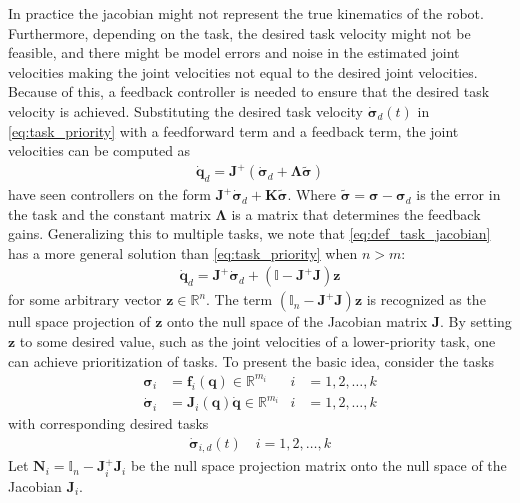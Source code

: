 In practice the jacobian might not represent the true kinematics of the robot.
Furthermore, depending on the task, the desired task velocity might not be feasible,
and there might be model errors and noise in the estimated joint velocities making
the joint velocities not equal to the desired joint velocities. Because of this,
a feedback controller is needed to ensure that the desired task velocity is
achieved. Substituting the desired task velocity $\dot{\bm{\sigma}}_d(t)$ in 
\autoref{eq:task_priority} with
a feedforward term and a feedback term, the joint velocities can be computed as
\begin{align}
    \dot{\bm{q}}_d = \bm{J}^{+} \left(\dot{\bm{\sigma}}_d + \bm{\Lambda}\tilde{\bm{\sigma}}\right)
\end{align}
{
    \color{red} have seen controllers on the form $\bm{J}^{+} \dot{\bm{\sigma}}_d + \bm{K}\tilde{\bm{\sigma}}$.
}
Where $\tilde{\bm{\sigma}} = \bm{\sigma} - \bm{\sigma}_d$ is the error in the
task and the constant matrix $\bm{\Lambda}$ is a matrix that determines the
feedback gains.
Generalizing this to multiple tasks, we note that \autoref{eq:def_task_jacobian}
has a more general solution than \autoref{eq:task_priority} when $n > m$:
\begin{align}
    \dot{\bm{q}}_d = \bm{J}^{+} \dot{\bm{\sigma}}_d + (\mathbb{I} - \bm{J}^{+} \bm{J}) \bm{z}
\end{align}
for some arbitrary vector $\bm{z} \in \mathbb{R}^n$. The term
$(\mathbb{I}_n - \bm{J}^{+} \bm{J}) \bm{z}$ is recognized as the null space projection
of $\bm{z}$ onto the null space of the Jacobian matrix $\bm{J}$. By setting
$\bm{z}$ to some desired value, such as the joint velocities of a lower-priority task,
one can achieve prioritization of tasks. To present the basic idea, consider the
tasks
\begin{subequations}
\begin{align}
    \bm{\sigma}_i &= \bm{f}_i(\bm{q}) \in \mathbb{R}^{m_i} &i &= 1, 2, \ldots, k \\
    \dot{\bm{\sigma}}_i &= \bm{J}_i(\bm{q}) \dot{\bm{q}} \in \mathbb{R}^{m_i} &i &= 1, 2, \ldots, k
\end{align}
\end{subequations}
with corresponding desired tasks
\begin{align}
    \dot{\bm{\sigma}}_{i,d}(t) \quad i = 1, 2, \ldots, k
\end{align}
Let $\bm{N}_i = \mathbb{I}_n - \bm{J}_i^{+} \bm{J}_i$ be the null space projection
matrix onto the null space of the Jacobian $\bm{J}_i$.
